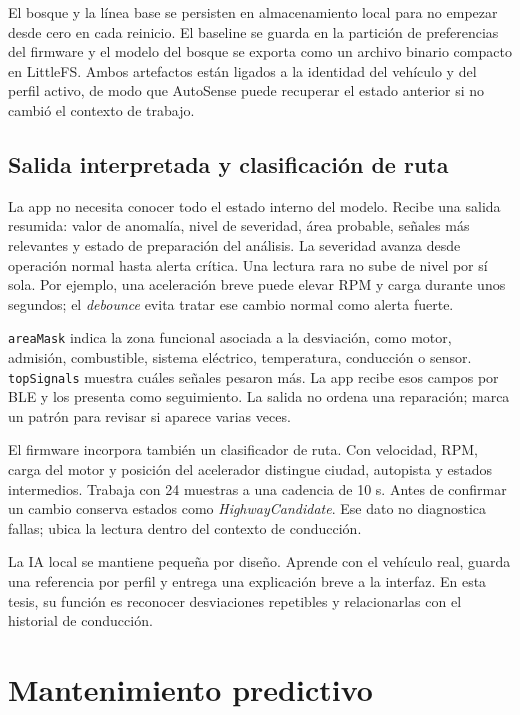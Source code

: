 \documentclass[12pt,letterpaper]{report}
\begin{document}
El bosque y la línea base se persisten en almacenamiento local para no empezar desde cero en cada reinicio. El baseline se guarda en la partición de preferencias del firmware y el modelo del bosque se exporta como un archivo binario compacto en LittleFS. Ambos artefactos están ligados a la identidad del vehículo y del perfil activo, de modo que AutoSense puede recuperar el estado anterior si no cambió el contexto de trabajo.

\subsection{Salida interpretada y clasificación de ruta}

La app no necesita conocer todo el estado interno del modelo. Recibe una salida resumida: valor de anomalía, nivel de severidad, área probable, señales más relevantes y estado de preparación del análisis. La severidad avanza desde operación normal hasta alerta crítica. Una lectura rara no sube de nivel por sí sola. Por ejemplo, una aceleración breve puede elevar RPM y carga durante unos segundos; el \textit{debounce} evita tratar ese cambio normal como alerta fuerte.

\texttt{areaMask} indica la zona funcional asociada a la desviación, como motor, admisión, combustible, sistema eléctrico, temperatura, conducción o sensor. \texttt{topSignals} muestra cuáles señales pesaron más. La app recibe esos campos por BLE y los presenta como seguimiento. La salida no ordena una reparación; marca un patrón para revisar si aparece varias veces.

El firmware incorpora también un clasificador de ruta. Con velocidad, RPM, carga del motor y posición del acelerador distingue ciudad, autopista y estados intermedios. Trabaja con 24 muestras a una cadencia de 10 s. Antes de confirmar un cambio conserva estados como \textit{HighwayCandidate}. Ese dato no diagnostica fallas; ubica la lectura dentro del contexto de conducción.

La IA local se mantiene pequeña por diseño. Aprende con el vehículo real, guarda una referencia por perfil y entrega una explicación breve a la interfaz. En esta tesis, su función es reconocer desviaciones repetibles y relacionarlas con el historial de conducción.

\section{Mantenimiento predictivo}
\end{document}

